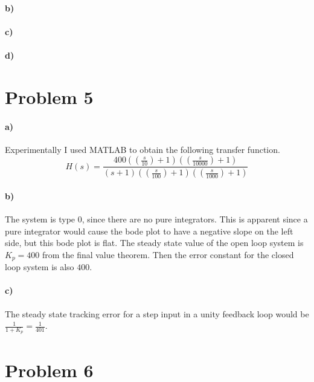\documentclass[12pt]{article}
\begin{document}
\paragraph{b)}

\paragraph{c)}

\paragraph{d)}

\section*{Problem 5}

\paragraph{a)}

Experimentally I used MATLAB to obtain the following transfer function.
\[H(s)=\frac{400\left(\left(\frac{s}{10}\right)+1\right)\left(\left(\frac{s}{10000}\right)+1\right)}{(s+1)\left(\left(\frac{s}{100}\right)+1\right)\left(\left(\frac{s}{1000}\right)+1\right)}\]

\paragraph{b)}

The system is type 0, since there are no pure integrators. This is apparent since a pure integrator would cause the bode plot to have a negative slope on the left side, but this
bode plot is flat. The steady state value of the open loop system is \(K_p=400\) from the final value theorem. Then the error constant for the closed loop
system is also \(400\).

\paragraph{c)}

The steady state tracking error for a step input in a unity feedback loop would be \(\frac{1}{1+K_p}=\frac{1}{401}\).

\section*{Problem 6}
\end{document}
